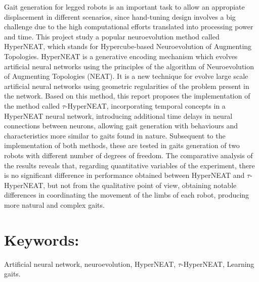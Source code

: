 Gait generation for legged robots is an important task to allow an appropiate displacement in different scenarios, since hand-tuning design involves a big challenge due to the high computational efforts translated into processing power and time. This project study a popular neuroevolution method called HyperNEAT, which stands for Hypercube-based Neuroevolution of Augmenting Topologies. HyperNEAT is a generative encoding mechanism which evolves artificial neural networks using the principles of the algorithm of Neuroevolution of Augmenting Topologies (NEAT). It is a new technique for evolve large scale artificial neural networks using geometric regularities of the problem present in the network. Based on this method, this report proposes the implementation of the method called \(\tau\)-HyperNEAT, incorporating temporal concepts in a HyperNEAT neural network, introducing additional time delays in neural connections between neurons, allowing gait generation with behaviours and characteristics more similar to gaits found in nature. Subsequent to the implementation of both methods, these are tested in gaits generation of two robots with different number of degrees of freedom. The comparative analysis of the results reveals that, regarding quantitative variables of the experiment, there is no significant difference in performance obtained between HyperNEAT and \(\tau\)-HyperNEAT, but not from the qualitative point of view, obtaining notable differences in coordinating the movement of the limbs of each robot, producing more natural and complex gaits.

\section*{Keywords:} Artificial neural network, neuroevolution, HyperNEAT, \(\tau\)-HyperNEAT, Learning gaits.